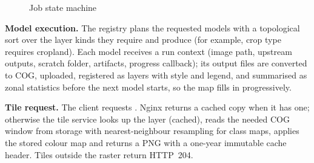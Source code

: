 \begin{figure}[htbp]
\centering
{}
\caption{Job state machine}
\label{fig:states}
\end{figure}

\textbf{Model execution.} The registry plans the requested models with a topological sort over the
layer kinds they require and produce (for example, crop type requires cropland). Each model receives
a run context (image path, upstream outputs, scratch folder, artifacts, progress callback); its
output files are converted to COG, uploaded, registered as layers with style and legend, and
summarised as zonal statistics before the next model starts, so the map fills in progressively.

\textbf{Tile request.} The client requests . Nginx
returns a cached copy when it has one; otherwise the tile service looks up the layer (cached),
reads the needed COG window from storage with nearest-neighbour resampling for class maps, applies
the stored colour map and returns a PNG with a one-year immutable cache header. Tiles outside the
raster return HTTP~204.
